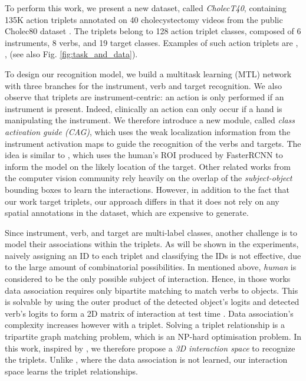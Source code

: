 \documentclass[english,runningheads,a4paper]{llncs}
\begin{document}
To perform this work, we present a new dataset, called \textit{CholecT40}, containing 135K action triplets annotated on 40 cholecystectomy videos from the public Cholec80 dataset \cite{twinanda_endonet_ieee2017}. The triplets belong to 128 action triplet classes, composed of 6 instruments, 8 verbs, and 19 target classes.
Examples of such action triplets are {\textrangle, \textrangle, \textrangle} (see also Fig. \ref{fig:task_and_data}).

To design our recognition model, we build a multitask learning (MTL) network with three branches for the instrument, verb and target recognition. 
We also observe that triplets are instrument-centric: an action is only performed if an instrument is present. Indeed, clinically an action can only occur if a hand is manipulating the instrument. We therefore introduce a new module, called {\it class activation guide (CAG)}, which uses the weak localization information from the instrument activation maps to guide the recognition of the verbs and targets. 
The idea is similar to \cite{gkioxari_hoi_cvpr2018}, which uses the human's ROI produced by FasterRCNN to inform the model on the likely location of the target. Other related works from the computer vision community \cite{xu_hoi_cvpr2019,qi_hoi_eccv2018,shen_hoi_wacv2018} rely heavily on the overlap of the \textit{subject-object} bounding boxes to learn the interactions. However, in addition to the fact that our work target triplets, our approach differs in that it does not rely on any spatial annotations in the dataset, which are expensive to generate.

Since instrument, verb, and target are multi-label classes, another challenge is to model their associations within the triplets. As will be shown in the experiments, naively assigning an ID to each triplet and classifying the IDs is not effective, due to the large amount of combinatorial possibilities. 
In \cite{xu_hoi_cvpr2019,qi_hoi_eccv2018,shen_hoi_wacv2018} mentioned above, \textit{human} is considered to be the only possible subject of interaction. Hence, in those works data association requires only bipartite matching to match verbs to objects. This is solvable by using the outer product of the detected object's logits and detected verb's logits to form a 2D matrix of interaction at test time \cite{shen_hoi_wacv2018}. Data association's complexity increases however with a triplet. Solving a triplet relationship is a tripartite graph matching problem, which is an NP-hard optimisation problem. In this work, inspired by \cite{shen_hoi_wacv2018}, we therefore propose a {\it 3D interaction space} to recognize the triplets.
Unlike \cite{shen_hoi_wacv2018}, where the data association is not learned, our interaction space learns the triplet relationships.
\end{document}
